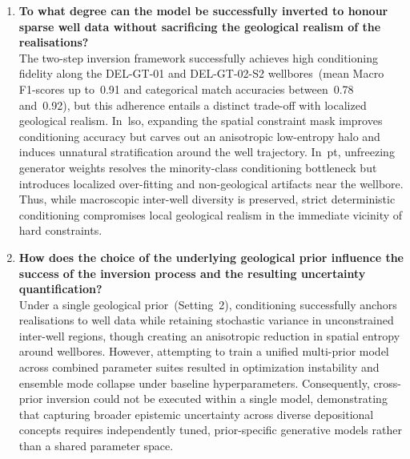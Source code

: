 \begin{enumerate}
    \item \textbf{To what degree can the model be successfully inverted to honour sparse well data without sacrificing the geological realism of the realisations?} \\
    The two-step inversion framework successfully achieves high conditioning fidelity along the DEL-GT-01 and DEL-GT-02-S2 wellbores~(mean Macro F1-scores up to~0.91 and categorical match accuracies between~0.78 and~0.92), but this adherence entails a distinct trade-off with localized geological realism. In~\gls{lso}, expanding the spatial constraint mask improves conditioning accuracy but carves out an anisotropic low-entropy halo and induces unnatural stratification around the well trajectory. In~\gls{pt}, unfreezing generator weights resolves the minority-class conditioning bottleneck but introduces localized over-fitting and non-geological artifacts near the wellbore. Thus, while macroscopic inter-well diversity is preserved, strict deterministic conditioning compromises local geological realism in the immediate vicinity of hard constraints.
    
    \item \textbf{How does the choice of the underlying geological prior influence the success of the inversion process and the resulting uncertainty quantification?} \\
    Under a single geological prior~(Setting~2), conditioning successfully anchors realisations to well data while retaining stochastic variance in unconstrained inter-well regions, though creating an anisotropic reduction in spatial entropy around wellbores. However, attempting to train a unified multi-prior model across combined parameter suites resulted in optimization instability and ensemble mode collapse under baseline hyperparameters. Consequently, cross-prior inversion could not be executed within a single model, demonstrating that capturing broader epistemic uncertainty across diverse depositional concepts requires independently tuned, prior-specific generative models rather than a shared parameter space.
\end{enumerate}

